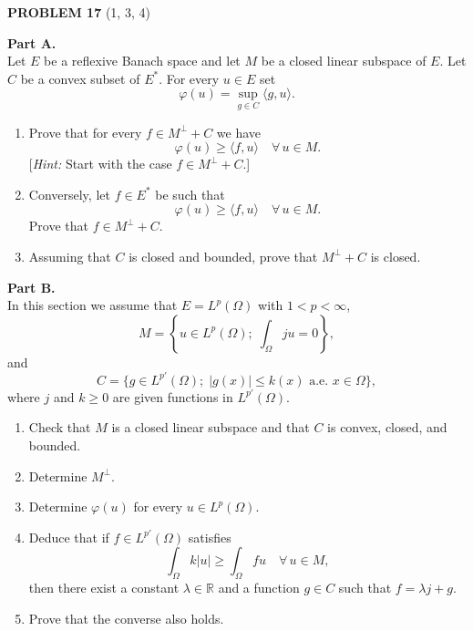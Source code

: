 \documentclass[12pt]{article}
\newcommand{\abs}[1]{\left|#1\right|}
\newcommand{\ip}[2]{\langle #1, #2 \rangle}
\newcommand{\R}{\mathbb{R}}
\begin{document}
\bigskip
 
\noindent\textbf{PROBLEM 17} (1, 3, 4)
 
\medskip
 
\noindent\textbf{Part A.}\\
Let $E$ be a reflexive Banach space and let $M$ be a closed linear subspace of $E$.
Let $C$ be a convex subset of $E^*$. For every $u \in E$ set
\[
\varphi(u) = \sup_{g \in C} \ip{g}{u}.
\]
 
\begin{enumerate}
\item Prove that for every $f \in M^\perp + C$ we have
\[
\varphi(u) \ge \ip{f}{u} \quad \forall\, u \in M.
\]
[\textit{Hint:} Start with the case $f \in M^\perp + C$.]
 
\item Conversely, let $f \in E^*$ be such that
\[
\varphi(u) \ge \ip{f}{u} \quad \forall\, u \in M.
\]
Prove that $f \in M^\perp + C$.
 
 
\item Assuming that $C$ is closed and bounded, prove that $M^\perp + C$ is closed.
\end{enumerate}
 
\noindent\textbf{Part B.}\\
In this section we assume that $E = L^p(\Omega)$ with $1 < p < \infty$,
\[
M = \left\{u \in L^p(\Omega);\; \int_\Omega ju = 0\right\},
\]
and
\[
C = \{g \in L^{p'}(\Omega);\; \abs{g(x)} \le k(x) \text{ a.e. } x \in \Omega\},
\]
where $j$ and $k \ge 0$ are given functions in $L^{p'}(\Omega)$.
 
\begin{enumerate}
\item Check that $M$ is a closed linear subspace and that $C$ is convex, closed, and bounded.
 
\item Determine $M^\perp$.
 
\item Determine $\varphi(u)$ for every $u \in L^p(\Omega)$.
 
\item Deduce that if $f \in L^{p'}(\Omega)$ satisfies
\[
\int_\Omega k\abs{u} \ge \int_\Omega fu \quad \forall\, u \in M,
\]
then there exist a constant $\lambda \in \R$ and a function $g \in C$ such that $f = \lambda j + g$.
 
\item Prove that the converse also holds.
\end{enumerate}
 
\end{document}
